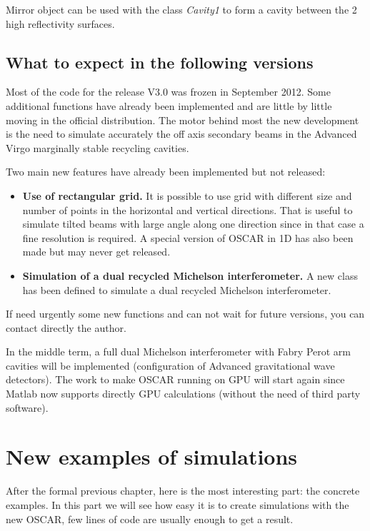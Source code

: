 Mirror object can be used with the class \textsl{Cavity1} to form a cavity between the 2 high reflectivity surfaces.


\section{What to expect in the following versions}

Most of the code for the release V3.0 was frozen in September 2012. Some additional functions have already been implemented and are little by little moving in the official distribution. The motor behind most the new development is the need to simulate accurately the off axis secondary beams in the Advanced Virgo marginally stable recycling cavities.

Two main new features have already been implemented but not released:

\begin{itemize}
  \item \textbf{Use of rectangular grid.} It is possible to use grid with different size and number of points in the horizontal and vertical directions. That is useful to simulate tilted beams with large angle along one direction since in that case a fine resolution is required. A special version of OSCAR in 1D has also been made but may never get released.
  \item \textbf{Simulation of a dual recycled Michelson interferometer.} A new class has been defined to simulate a dual recycled Michelson interferometer.
\end{itemize}

If need urgently some new functions and can not wait for future versions, you can contact directly the author.

In the middle term, a full dual Michelson interferometer with Fabry Perot arm cavities will be implemented (configuration of Advanced gravitational wave detectors). The work to make OSCAR running on GPU will start again since Matlab now supports directly GPU calculations (without the need of third party software).



\chapter{New examples of simulations}\label{ch4:ex}

After the formal previous chapter, here is the most interesting part: the concrete examples. In this part we will see how easy it is to create simulations with the new OSCAR, few lines of code are usually enough to get a result.

